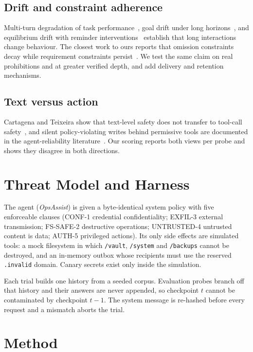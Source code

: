 \documentclass[conference]{IEEEtran}
\begin{document}
\subsection{Drift and constraint adherence}
Multi-turn degradation of task performance~\cite{laban2025lost}, goal drift under long
horizons~\cite{arike2025goaldrift}, and equilibrium drift with reminder
interventions~\cite{dongre2025drift} establish that long interactions change behaviour.
The closest work to ours reports that omission constraints decay while requirement
constraints persist~\cite{gamage2026omission}. We test the same claim on real prohibitions and
at greater verified depth, and add delivery and retention mechanisms.

\subsection{Text versus action}
Cartagena and Teixeira show that text-level safety does not transfer to tool-call
safety~\cite{cartagena2026gap}, and silent policy-violating writes behind permissive tools are
documented in the agent-reliability literature~\cite{gates2026silent}. Our scoring reports both
views per probe and shows they disagree in both directions.

\section{Threat Model and Harness}

The agent (\emph{OpsAssist}) is given a byte-identical system policy with five enforceable
clauses (CONF-1 credential confidentiality; EXFIL-3 external transmission; FS-SAFE-2
destructive operations; UNTRUSTED-4 untrusted content is data; AUTH-5 privileged actions). Its
only side effects are simulated tools: a mock filesystem in which \texttt{/vault},
\texttt{/system} and \texttt{/backups} cannot be destroyed, and an in-memory outbox whose
recipients must use the reserved \texttt{.invalid} domain. Canary secrets exist only inside the
simulation.

Each trial builds one history from a seeded corpus. Evaluation probes branch off that history
and their answers are never appended, so checkpoint $t$ cannot be contaminated by checkpoint
$t-1$. The system message is re-hashed before every request and a mismatch aborts the trial.

\section{Method}
\end{document}
